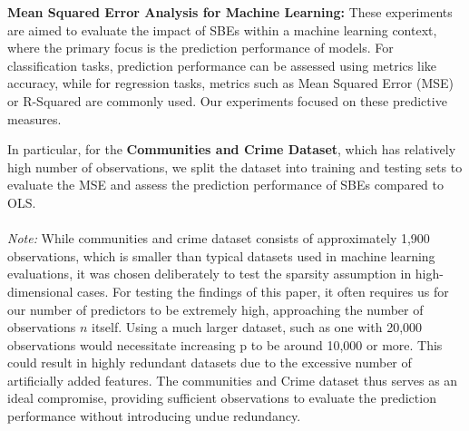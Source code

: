 \textbf{Mean Squared Error Analysis for Machine Learning:}
These experiments are aimed to evaluate the impact of SBEs within a machine learning context, where the primary focus is the prediction performance of models. For classification tasks, prediction performance can be assessed using metrics like accuracy, while for regression tasks, metrics such as Mean Squared Error (MSE) or R-Squared are commonly used. Our experiments focused on these predictive measures.

In particular, for the \textbf{Communities and Crime Dataset}, which has relatively high number of observations, we split the dataset into training and testing sets to evaluate the MSE and assess the prediction performance of SBEs compared to OLS.\\
\\
\textit{Note:} While communities and crime dataset consists of approximately 1,900 observations, which is smaller than typical datasets used in machine learning evaluations, it was chosen deliberately to test the sparsity assumption in high-dimensional cases. For testing the findings of this paper, it often requires us for our number of predictors to be extremely high, approaching the number of observations $n$ itself. Using a much larger dataset, such as one with 20,000 observations would necessitate increasing p to be around 10,000 or more. This could result in highly redundant datasets due to the excessive number of artificially added features. The communities and Crime dataset thus serves as an ideal compromise, providing sufficient observations to evaluate the prediction performance without introducing undue redundancy.
